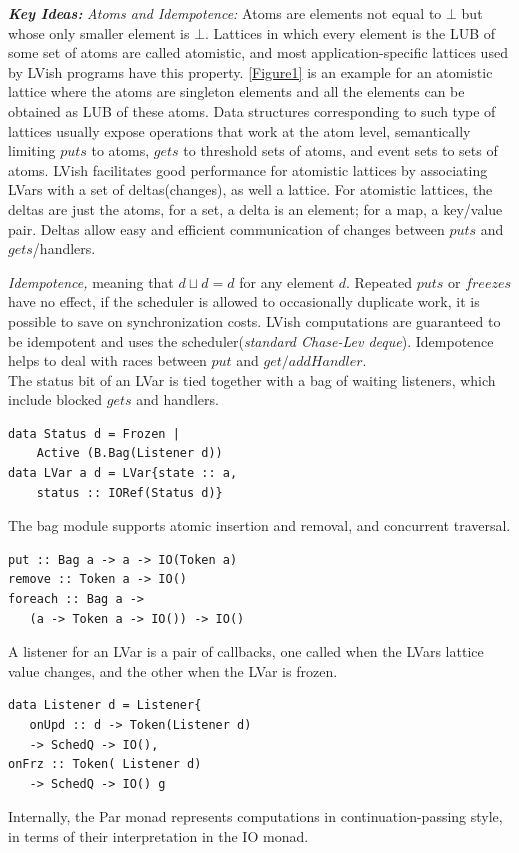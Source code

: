 \documentclass[twocolumn]{article}
\begin{document}
\textbf{\textit{Key Ideas:}} \textit{Atoms and Idempotence:} Atoms are elements not equal to $\bot$ but whose only smaller
element is $\bot$. Lattices in which every element is the LUB of some set of atoms are called atomistic, and most application-specific lattices used by LVish programs have this property. \ref{Figure1} is an example for an atomistic lattice where the atoms are singleton elements and all the elements can be obtained as LUB of these atoms. Data structures corresponding to such type of lattices usually expose operations that work at the atom level, semantically limiting $puts$ to atoms, $gets$ to threshold sets of atoms, and event sets to sets of atoms. LVish facilitates good performance for atomistic lattices by associating LVars with a set of deltas(changes), as well a lattice. For atomistic lattices, the deltas are just the atoms, for a set, a delta is an element; for a map, a key/value pair. Deltas allow easy and efficient communication of changes between $puts$ and $gets$/handlers. \par
\textit{Idempotence,} meaning that $d\sqcup{d=d}$ for any element $d$. Repeated $puts$ or $freezes$ have no effect, if the scheduler is allowed to occasionally duplicate work, it is possible to save on synchronization costs. LVish computations are guaranteed to be idempotent and uses the scheduler(\textit{standard Chase-Lev deque}). Idempotence helps to deal with races between $put$ and $get/addHandler$. \\ 
The status bit of an LVar is tied together with a bag of waiting listeners, which include blocked $gets$ and handlers.
\begin{verbatim}
data Status d = Frozen |
	Active (B.Bag(Listener d))
data LVar a d = LVar{state :: a,
	status :: IORef(Status d)} 
\end{verbatim}
The bag module supports atomic insertion and removal, and concurrent traversal.
\begin{verbatim}
put :: Bag a -> a -> IO(Token a)
remove :: Token a -> IO()
foreach :: Bag a ->
   (a -> Token a -> IO()) -> IO()
\end{verbatim}
A listener for an LVar is a pair of callbacks, one called when the LVars lattice value changes, and the other when the LVar is frozen. 
\begin{verbatim}
data Listener d = Listener{
   onUpd :: d -> Token(Listener d)
   -> SchedQ -> IO(),
onFrz :: Token( Listener d)
   -> SchedQ -> IO() g
\end{verbatim}
Internally, the Par monad represents computations in continuation-passing style, in terms of their interpretation in the IO monad.
\end{document}
